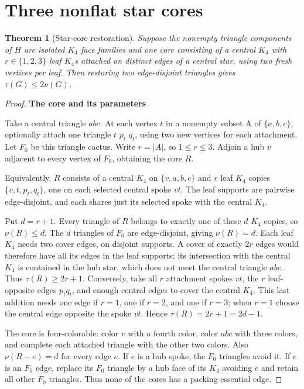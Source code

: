 \documentclass[11pt]{article}
\newtheorem{theorem}{Theorem}[section]
\theoremstyle{definition}\newtheorem{definition}[theorem]{Definition}
\theoremstyle{remark}\newtheorem{remark}[theorem]{Remark}
\begin{document}
\section{Three nonflat star cores}\label{sec:star}
\begin{theorem}[Star-core restoration]\label{thm:star}
Suppose the nonempty triangle components of $H$ are isolated $K_4$ face families and one core consisting of a central $K_4$ with $r\in\{1,2,3\}$ leaf $K_4$s attached on distinct edges of a central star, using two fresh vertices per leaf. Then restoring two edge-disjoint triangles gives $\tau(G)\le2\nu(G)$.
\end{theorem}
\begin{proof}\leavevmode
\par\medskip\noindent\textbf{The core and its parameters}\label{the-core-and-its-parameters}

Take a central triangle \(abc\). At each vertex \(t\) in a nonempty subset A of \(\{a,b,c\}\), optionally attach one triangle \(t\) \(p_t\) \(q_t\), using two new vertices for each attachment. Let \(F_0\) be this triangle cactus. Write \(r=|A|\), so \(1\le r\le 3\). Adjoin a hub \(v\) adjacent to every vertex of \(F_0\), obtaining the core \(R\).

Equivalently, \(R\) consists of a central \(K_4\) on \(\{v,a,b,c\}\) and \(r\) leaf \(K_4\) copies \(\{v,t,p_t,q_t\}\), one on each selected central spoke \(vt\). The leaf supports are pairwise edge-disjoint, and each shares just its selected spoke with the central \(K_4\).

Put \(d=r+1\). Every triangle of \(R\) belongs to exactly one of these \(d\) \(K_4\) copies, so \(\nu(R)\le d\). The \(d\) triangles of \(F_0\) are edge-disjoint, giving \(\nu(R)=d\). Each leaf \(K_4\) needs two cover edges, on disjoint supports. A cover of exactly \(2r\) edges would therefore have all its edges in the leaf supports; its intersection with the central \(K_4\) is contained in the hub star, which does not meet the central triangle \(abc\). Thus \(\tau(R)\ge 2r+1\). Conversely, take all \(r\) attachment spokes \(vt\), the \(r\) leaf-opposite edges \(p_t q_t\), and enough central edges to cover the central \(K_4\). This last addition needs one edge if \(r=1\), one if \(r=2\), and one if \(r=3\); when \(r=1\) choose the central edge opposite the spoke \(vt\). Hence \(\tau(R)=2r+1=2d-1\).

The core is four-colorable: color \(v\) with a fourth color, color \(abc\) with three colors, and complete each attached triangle with the other two colors. Also \(\nu(R-e)=d\) for every edge \(e\). If \(e\) is a hub spoke, the \(F_0\) triangles avoid it. If \(e\) is an \(F_0\) edge, replace its \(F_0\) triangle by a hub face of its \(K_4\) avoiding \(e\) and retain all other \(F_0\) triangles. Thus none of the cores has a packing-essential edge.


\end{proof}
\end{document}
